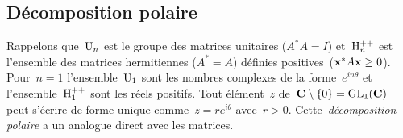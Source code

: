 








%
%
%
%
%
%
%
%

\subsection{Décomposition polaire}

Rappelons que~$\mathrm{U}_n$ est le groupe des matrices unitaires ($A^*A=I$)
et~$\mathrm{H}_n^{++}$ est l'ensemble des matrices hermitiennes ($A^*=A$) définies
positives~($\mathbf{x}^*A\mathbf{x}\ge 0$).  Pour~$n=1$ l'ensemble~$\mathrm{U}_1$ sont les nombres
complexes de la forme~$e^{in\theta}$ et l'ensemble~$\mathrm{H}_1^{++}$ sont les réels
positifs.  Tout élément~$z$ de~$\mathbf{C}\setminus\{0\}=\mathrm{GL}_1(\mathbf{C})$ peut s'écrire de
forme unique comme~$z=re^{i\theta}$ avec~$r>0$.  Cette~\emph{décomposition
polaire} a un analogue direct avec les matrices.

